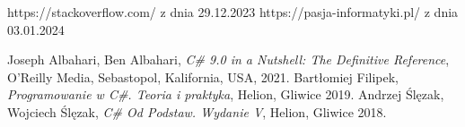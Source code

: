 \documentclass[polish,12pt,twoside,a4paper]{report}
\begin{document}



\newpage

\newpage

\newpage

\newpage

\newpage

\newpage

\newpage

\begin{thebibliography}{6}


 https://stackoverflow.com/ z dnia 29.12.2023
 https://pasja-informatyki.pl/ z dnia 03.01.2024

Joseph Albahari, Ben Albahari, {\it C\# 9.0 in a Nutshell: The Definitive Reference},  O'Reilly Media, Sebastopol, Kalifornia, USA, 2021.
Bartłomiej Filipek, {\it Programowanie w C\#. Teoria i praktyka}, Helion, Gliwice 2019.
Andrzej Ślęzak, Wojciech Ślęzak, {\it C\# Od Podstaw. Wydanie V}, Helion, Gliwice 2018.
\end{thebibliography}
\newpage
\end{document}
